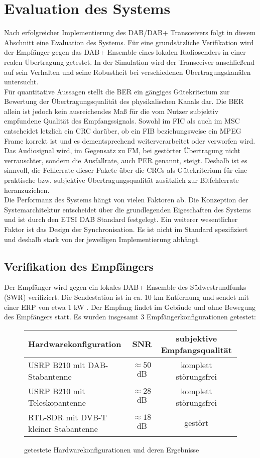 \chapter{Evaluation des Systems}
\label{sec:evaluation}
Nach erfolgreicher Implementierung des DAB/DAB+ Transceivers folgt in diesem Abschnitt eine Evaluation des Systems. Für eine grundsätzliche Verifikation wird der Empfänger gegen das DAB+ Ensemble eines lokalen Radiosenders in einer realen Übertragung getestet. In der Simulation wird der Transceiver anschließend auf sein Verhalten und seine Robustheit bei verschiedenen Übertragungskanälen untersucht. \\
Für quantitative Aussagen stellt die \ac{BER} ein gängiges Gütekriterium zur Bewertung der Übertragungsqualität des physikalischen Kanals dar. Die \ac{BER} allein ist jedoch kein ausreichendes Maß für die vom Nutzer subjektiv empfundene Qualität des Empfangssignals. Sowohl im FIC als auch im MSC entscheidet letzlich ein CRC darüber, ob ein FIB beziehungsweise ein MPEG Frame korrekt ist und es dementsprechend weiterverarbeitet oder verworfen wird. Das Audiosignal wird, im Gegensatz zu FM, bei gestörter Übertragung nicht verrauschter, sondern die Ausfallrate, auch \ac{PER} genannt, steigt. Deshalb ist es sinnvoll, die Fehlerrate dieser Pakete über die CRCs als Gütekriterium für eine praktische bzw. subjektive Übertragungsqualität zusätzlich zur Bitfehlerrate heranzuziehen.\\

Die Performanz des Systems hängt von vielen Faktoren ab. Die Konzeption der Systemarchitektur entscheidet über die grundlegenden Eigeschaften des Systems und ist durch den ETSI DAB Standard \cite{etsi:dab_main} festgelegt. Ein weiterer wesentlicher Faktor ist das Design der Synchronisation. Es ist nicht im Standard spezifiziert und deshalb stark von der jeweiligen Implementierung abhängt.

\section{Verifikation des Empfängers}
Der Empfänger wird gegen ein lokales DAB+ Ensemble des Südwestrundfunks (SWR) verifiziert. Die Sendestation ist in ca. 10 km Entfernung und sendet mit einer \ac{ERP} von etwa 1 kW \cite{web:wattkopf_sender}. Der Empfang findet im Gebäude und ohne Bewegung des Empfängers statt. Es wurden insgesamt 3 Empfängerkonfigurationen getestet:

\begin{figure} [h]
\begin{tabular}{l | c | c}
Hardwarekonfiguration & SNR & subjektive Empfangsqualität \\
\hline
USRP B210 mit DAB-Stabantenne & $\approx 50$ dB & komplett störungsfrei \\
USRP B210 mit Teleskopantenne & $\approx 28$ dB & komplett störungsfrei \\
RTL-SDR mit DVB-T kleiner Stabantenne & $\approx 18$ dB & gestört
\end{tabular}
\caption{getestete Hardwarekonfigurationen und deren Ergebnisse}
\label{tab:hardware}
\end{figure}

